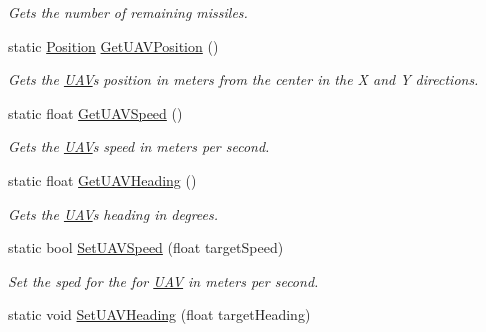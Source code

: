 \begin{DoxyCompactItemize}
\begin{DoxyCompactList}\small\item\em Gets the number of remaining missiles. \end{DoxyCompactList}\item 
\mbox{\label{class_n_g_a_p_i_1_1_a_p_i_a889ebb574b908674dacef83a2c3d048f}} 
static \hyperlink{struct_n_g_a_p_i_1_1_position}{Position} \hyperlink{class_n_g_a_p_i_1_1_a_p_i_a889ebb574b908674dacef83a2c3d048f}{Get\+U\+A\+V\+Position} ()
\begin{DoxyCompactList}\small\item\em Gets the \hyperlink{class_n_g_a_p_i_1_1_u_a_v}{U\+AV}\textquotesingle{}s position in meters from the center in the X and Y directions. \end{DoxyCompactList}\item 
\mbox{\label{class_n_g_a_p_i_1_1_a_p_i_af02ffd997c2941a87a020b74c1852cbf}} 
static float \hyperlink{class_n_g_a_p_i_1_1_a_p_i_af02ffd997c2941a87a020b74c1852cbf}{Get\+U\+A\+V\+Speed} ()
\begin{DoxyCompactList}\small\item\em Gets the \hyperlink{class_n_g_a_p_i_1_1_u_a_v}{U\+AV}\textquotesingle{}s speed in meters per second. \end{DoxyCompactList}\item 
\mbox{\label{class_n_g_a_p_i_1_1_a_p_i_af9bb6767a9d7b036ec43da9b16e10319}} 
static float \hyperlink{class_n_g_a_p_i_1_1_a_p_i_af9bb6767a9d7b036ec43da9b16e10319}{Get\+U\+A\+V\+Heading} ()
\begin{DoxyCompactList}\small\item\em Gets the \hyperlink{class_n_g_a_p_i_1_1_u_a_v}{U\+AV}\textquotesingle{}s heading in degrees. \end{DoxyCompactList}\item 
static bool \hyperlink{class_n_g_a_p_i_1_1_a_p_i_a362ce9fec87f71fc8b93e8080f83653a}{Set\+U\+A\+V\+Speed} (float target\+Speed)
\begin{DoxyCompactList}\small\item\em Set the sped for the for \hyperlink{class_n_g_a_p_i_1_1_u_a_v}{U\+AV} in meters per second. \end{DoxyCompactList}\item 
static void \hyperlink{class_n_g_a_p_i_1_1_a_p_i_a4f4b52858fe2894e7536c1de321fa894}{Set\+U\+A\+V\+Heading} (float target\+Heading)

\end{DoxyCompactItemize}
